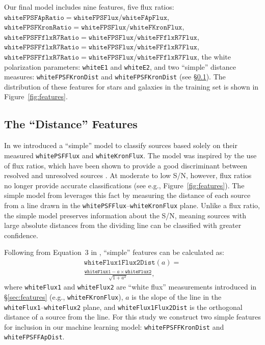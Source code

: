 \documentclass[twocolumn]{aastex63}
\begin{document}
Our final model includes nine features, five flux ratios:\\
$\mathtt{whiteFPSFApRatio} = \mathtt{whiteFPSFlux/whiteFApFlux}$,
$\mathtt{whiteFPSFKronRatio} = \mathtt{whiteFPSFlux/whiteFKronFlux}$,
$\mathtt{whiteFPSFFflxR7Ratio} = \mathtt{whiteFPSFlux/whiteFFflxR7Flux}$,
$\mathtt{whiteFPSFFflxR7Ratio} = \mathtt{whiteFPSFlux/whiteFFflxR7Flux}$,
$\mathtt{whiteFPSFFflxR7Ratio} = \mathtt{whiteFPSFlux/whiteFFflxR7Flux}$, the
white polarization parameters: \texttt{whiteE1} and \texttt{whiteE2}, and two
``simple'' distance measures: \texttt{whiteFPSFKronDist} and
\texttt{whiteFPSFKronDist} (see \S\ref{sec:simple_model}). The distribution of
these features for stars and galaxies in the training set is shown in
Figure~\ref{fig:features}.

\subsection{The ``Distance'' Features}\label{sec:simple_model}

In \citet{Tachibana18} we introduced a ``simple'' model to classify sources
based solely on their measured \texttt{whitePSFFlux} and
\texttt{whiteKronFlux}. The model was inspired by the use of flux ratios,
which have been shown to provide a good discriminant between resolved and
unresolved sources \citep[e.g., the SDSS morphological \texttt{CLASS}
parameter][]{Lupton01}. At moderate to low S/N, however, flux ratios no longer
provide accurate classifications (see e.g., Figure~\ref{fig:features}). The
simple model from \citet{Tachibana18} leverages this fact by measuring the
distance of each source from a line drawn in the
\texttt{whitePSFFlux}--\texttt{whiteKronFlux} plane. Unlike a flux ratio, the
simple model preserves information about the S/N, meaning sources with large
absolute distances from the dividing line can be classified with greater
confidence.

Following from Equation~3 in \citet{Tachibana18}, ``simple'' features can be
calculated as:
%
\begin{multline}
 \mathtt{whiteFlux1Flux2Dist}(a) = \\
 \frac{\mathtt{whiteFlux1} - a\times\mathtt{whiteFlux2}}{ \sqrt{1 + a^2}},
 \label{eqn:simple_feat}
\end{multline}
%
where \texttt{whiteFlux1} and \texttt{whiteFlux2} are ``white flux''
measurements introduced in \S\ref{sec:features} (e.g.,
\texttt{whiteFKronFlux}), $a$ is the slope of the line in the
\texttt{whiteFlux1}--\texttt{whiteFlux2} plane, and
\texttt{whiteFlux1Flux2Dist} is the orthogonal distance of a source from the
line. For this study we construct two simple features for inclusion in our
machine learning model: \texttt{whiteFPSFFKronDist} and
\texttt{whiteFPSFFApDist}.
\end{document}
